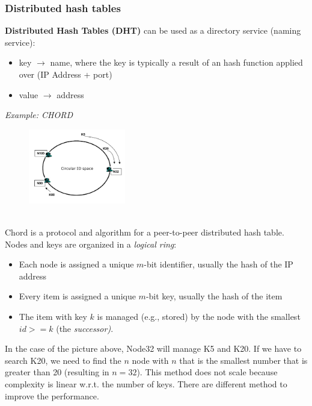 \documentclass[10pt,a4paper]{article}
\begin{document}
\subsubsection{Distributed hash tables}
\textbf{Distributed Hash Tables (DHT)} can be used as a directory service (naming service):
\begin{itemize}
	\item key $\rightarrow$ name, where the key is typically a result of an hash function applied over \linebreak (IP Address + port)
	\item value $\rightarrow$ address
\end{itemize} \pagebreak
\textit{Example: CHORD} \\
\begin{figure}[h!]
 \hfill \includegraphics[width=120pt]{images/chord.png}\hspace*{\fill}
  \label{fig:chord}
\end{figure} \\
Chord is a protocol and algorithm for a peer-to-peer distributed hash table.
Nodes and keys are organized in a \textit{logical ring}:
\begin{itemize}
	\item Each node is assigned a unique $m$-bit identifier, usually the hash of the IP address
	\item Every item is assigned a unique $m$-bit key, usually the hash of the item
	\item The item with key $k$ is managed (e.g., stored) by the node with the smallest $id >= k$ (the \textit{successor)}.
\end{itemize}
In the case of the picture above, Node32 will manage K5 and K20. If we have to search K20, we need to find the $n$ node with $n$ that is the smallest number that is greater than 20 (resulting in $n=32$). This method does not scale because complexity is linear w.r.t. the number of keys. There are different method to improve the performance.
\end{document}
